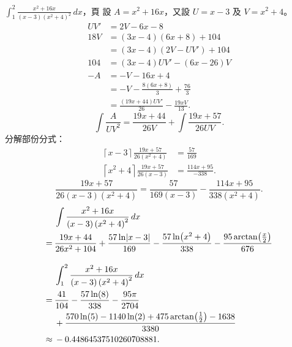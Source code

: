 \documentclass{beamer}
\newcommand{\Left} {\mathopen{}\mathclose\bgroup\left}
\newcommand{\Right}{\aftergroup\egroup\right}
\theoremstyle{remark}
\begin{document}
\begin{CJK}{UTF8}{bsmi}
\begin{frame}[allowframebreaks]{$\displaystyle \int_1^2 \frac{x^2 + 16x}{(x-3) \left( x^2 + 4 \right)^2}\,dx$，頁}
  設 $A = x^2 + 16x$，又設 $U = x-3$ 及 $V = x^2 + 4$。
  \begin{align*}
    UV' &= 2V - 6x - 8\\
    18V &= (3x - 4) \left( 6x + 8 \right) + 104\\
	&= (3x - 4) \left( 2V - UV' \right) + 104\\
    104 &= \left( 3x - 4 \right) UV' - \left( 6x - 26 \right) V\\
    -A  &= -V - 16x + 4\\
	&= -V - \frac{8 \left( 6x + 8 \right)}{3} + \frac{76}{3}\\
	&= \frac{\left( 19x + 44 \right) UV'}{26} - \frac{19xV}{13}.
  \end{align*}
  \[\int \frac{A}{UV^2} = \frac{19x + 44}{26V} + \int \frac{19x + 57}{26UV}.\]
  分解部份分式：
  \begin{align*}
    \left\lceil x - 3 \right\rceil   \frac{19x + 57}{26 \left( x^2 + 4 \right)} &= \frac{57}{169}\\
    \left\lceil x^2 + 4 \right\rceil \frac{19x + 57}{26 \left( x   - 3 \right)} &= \frac{114x + 95}{-338}.
  \end{align*}
  \[\frac{19x + 57}{26 \left( x-3 \right) \left( x^2 + 4 \right)} = \frac{57}{169 \left( x-3 \right)} 
    - \frac{114x + 95}{338 \left( x^2 + 4 \right)}.\]
  \begin{align*}
       & \int \frac{x^2 + 16x}{(x-3) \left( x^2 + 4 \right)^2}\,dx\\
    =\:& \frac{19x + 44}{26x^2 + 104} + \frac{57 \ln \Left| x-3 \Right|}{169} - \frac{57 \ln \Left( x^2 + 4 \Right)}{338} 
	 -\frac{95 \arctan \Left( \frac x 2 \Right)}{676}\\[1em]
       & \int_1^2 \frac{x^2 + 16x}{(x-3) \left( x^2 + 4 \right)^2}\,dx\\
    =\:& \frac{41}{104} - \frac{57\ln(8)}{338} - \frac{95\pi}{2704}\\
    \phantom=\:& +\frac{570\ln(5) - 1140\ln(2) + 475 \arctan \Left( \frac12 \Right) - 1638}{3380}\\
    \approx\:& -0.44864537510260708881.
  \end{align*}
\end{frame}


\end{CJK}
\end{document}
